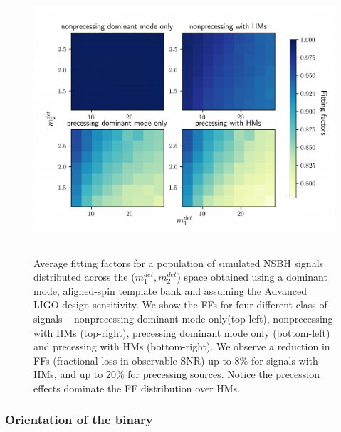 \begin{figure}
    \centering
    \includegraphics[width=13cm, height=10cm]{figures/HM_and_precession/aLIGO_FF_masses.pdf}
    \caption{Average fitting factors for a population of simulated NSBH signals distributed across the ($m_1^{det}, m_2^{det}$) space obtained using a dominant mode, aligned-spin template bank and assuming the Advanced LIGO design sensitivity. We show the FFs for four different class of signals -- nonprecessing dominant mode only(top-left), nonprecessing with HMs (top-right),  precessing dominant mode only (bottom-left) and  precessing with HMs (bottom-right). We observe a reduction in FFs (fractional loss in observable SNR) up to $8\%$ for signals with HMs, and up to $20 \%$ for precessing sources. Notice the precession effects dominate the FF distribution over HMs.}
    \label{fig:FF_m1m2}
\end{figure}

\subsubsection{Orientation of the binary}

